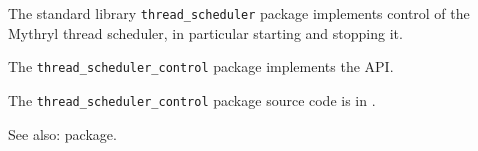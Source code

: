 
The standard library {\tt thread\_scheduler} package implements control of the Mythryl thread scheduler, in particular starting and stopping it.

The {\tt thread\_scheduler\_control} package implements the  API.

The {\tt thread\_scheduler\_control} package source code is in .

See also:  package.

